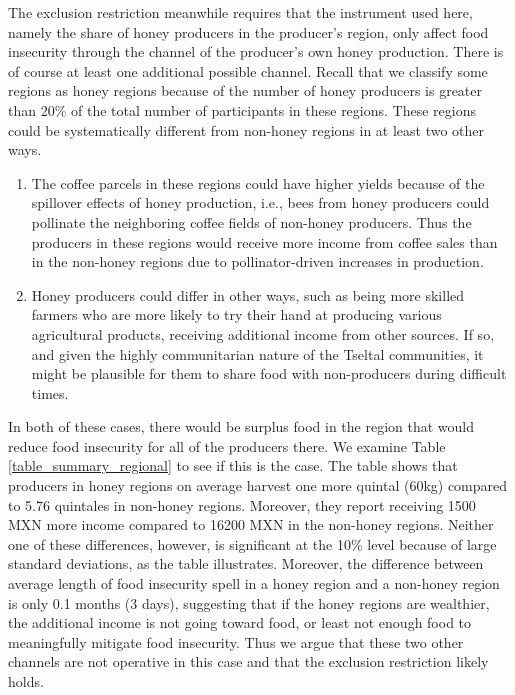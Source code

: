 \documentclass[../main.tex]{subfiles}
\begin{document}
The exclusion restriction meanwhile requires that the instrument used here, namely the share of honey producers in the producer's region, only affect food insecurity through the channel of the producer's own honey production. There is of course at least one additional possible channel. Recall that we classify some regions
as honey regions because of the number of honey producers is greater than 20\% of the total  number of participants in these regions. These regions could be systematically different from non-honey regions in at least two other ways. 
\begin{enumerate}
    \item The coffee parcels in these regions could have higher yields because of the spillover effects of honey production, i.e., bees from honey producers could pollinate the neighboring coffee fields of non-honey producers. Thus the producers in these regions would receive more income from coffee sales than in the non-honey regions due to pollinator-driven increases in production.  
    \item Honey producers could differ in other ways, such as being more skilled farmers who are more likely to try their hand at producing various agricultural products, receiving additional income from other sources. If so, and given the highly communitarian nature of the Tseltal communities, it might be plausible for them to share food with non-producers during difficult times. 
\end{enumerate}
In both of these cases, there would be surplus food in the region that would reduce food insecurity for all of the producers there. We examine Table \ref{table_summary_regional} to see if this is the case. The table shows that producers in honey regions
on average harvest one more quintal  (60kg) compared to 5.76 quintales in non-honey regions. Moreover, they report receiving 1500 MXN more income compared to 16200 MXN in the non-honey regions. Neither one of these differences, however,
is significant at the 10\% level because of large standard deviations, as the
table illustrates.
Moreover, the difference between average length of food insecurity
spell in a honey region and a non-honey region is only 0.1 months (3 days), suggesting that if the honey regions are wealthier, the additional income is not going toward food, or least not enough food to meaningfully mitigate food insecurity. 
Thus we argue that these two other channels are not operative in this case and that the exclusion restriction likely holds.
\end{document}
